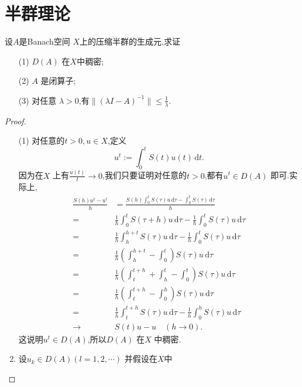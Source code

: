 \section{半群理论}
\begin{exercise}
  设$A$是Banach空间 $X$上的压缩半群的生成元,求证
   \begin{enumerate}
     \item [(1)] $D(A)$ 在$X$中稠密;
     \item [(2)] $A$ 是闭算子;
     \item [(3)] 对任意 $\lambda>0$,有$\|(\lambda I-A)^{-1}\|\le \frac{1}{\lambda}$.
  \end{enumerate}
\end{exercise}
\begin{proof}
  \begin{enumerate}
    \item [(1)] 对任意的$t>0,u \in X$,定义
      \[
	u^{t}:=\int_0^{t}S(t)u(t)\,\mathrm{d}t.
      \] 
      因为在$X$ 上有$\frac{u(t)}{t}\to 0$,我们只要证明对任意的$t>0$,都有$u^{t}\in D(A)$ 即可.实际上,
      \begin{equation}
        \begin{aligned}
	  \frac{S(h)u^{t}-u^{t}}{h}&=\frac{S(h)\int_0^{t}S(\tau )u\,\mathrm{d}\tau -\int_0^{t}S(\tau )\,\mathrm{d}\tau }{h}\\
	  = &\frac{1}{h} \int_0^{t}S(\tau +h) u\,\mathrm{d}\tau - \frac{1}{h}\int_0^{t}S(\tau )u\,\mathrm{d}\tau\\
	  = & \frac{1}{h}\int_h^{h+t }S(\tau )u\,\mathrm{d}\tau - \frac{1}{h}\int_0^{t}S(\tau )u \,\mathrm{d}\tau \\
	  = & \frac{1}{h}\left( \int_h^{h+t}-\int_0^{t} \right) S(\tau )u\,\mathrm{d}\tau \\
	  = & \frac{1}{h}\left( \int_t ^{t+h}+\int_h^{t}-\int_0^{t} \right) S(\tau )u\,\mathrm{d}\tau\\
	  = & \frac{1}{h}\left( \int_t ^{t+h} -\int_0^{h} \right) S(\tau )u\,\mathrm{d}\tau \\
	  = & \frac{1}{h}\int_t ^{t+h}S(\tau )u\,\mathrm{d}\tau -\frac{1}{h}\int_0^{h}S(\tau )u\,\mathrm{d}\tau \\
	  \to & S(t)u-u\quad \left( h\to 0 \right) .
        \end{aligned}
      \end{equation}
      这说明$u^{t}\in D(A)$,所以$D(A)$ 在$X$ 中稠密.
    \item 设$u_k\in  D(A) (l=1,2,\cdots)$ 并假设在$X$中
      \begin{equation}\label{eqn-12}

\end{equation}
\end{enumerate}
\end{proof}
